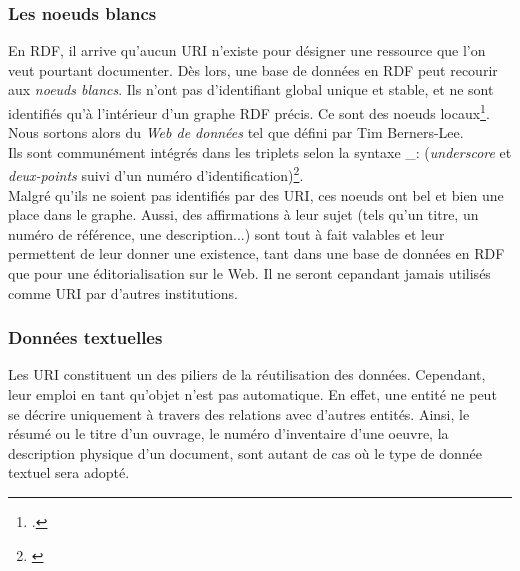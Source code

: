 \documentclass[a4paper,12pt,twoside]{book}
\begin{document}
\subsubsection{Les noeuds blancs}

En RDF, il arrive qu'aucun URI n'existe pour désigner une ressource que l'on veut pourtant documenter. Dès lors, une base de données en RDF peut recourir aux \textit{noeuds blancs}. Ils n'ont pas d'identifiant global unique et stable, et ne sont identifiés qu'à l'intérieur d'un graphe RDF précis. Ce sont des noeuds locaux\footnote{\cite[p.~76-78]{bermesWebSemantiqueBibliotheque2013}.}. Nous sortons alors du \textit{Web de données} tel que défini par Tim Berners-Lee.\\

Ils sont communément intégrés dans les triplets selon la syntaxe \og \_: \fg{} (\textit{underscore} et \textit{deux-points} suivi d'un numéro d'identification)\footnote{\cite[p.~13]{maillotApercusRechercheInterroger2014}}.\\


Malgré qu'ils ne soient pas identifiés par des URI, ces noeuds ont bel et bien une place dans le graphe. Aussi, des affirmations à leur sujet (tels qu'un titre, un numéro de référence, une description...) sont tout à fait valables et leur permettent de leur donner une existence, tant dans une base de données en RDF que pour une éditorialisation sur le Web. Il ne seront cepandant jamais utilisés comme URI par d'autres institutions. 

\subsubsection{Données textuelles}

Les URI constituent un des piliers de la réutilisation des données. Cependant, leur emploi en tant qu'objet n'est pas automatique. En effet, une entité ne peut se décrire uniquement à travers des relations avec d'autres entités. Ainsi, le résumé ou le titre d'un ouvrage, le numéro d'inventaire d'une oeuvre, la description physique d'un document, sont autant de cas où le type de donnée textuel sera adopté.\\
\end{document}
